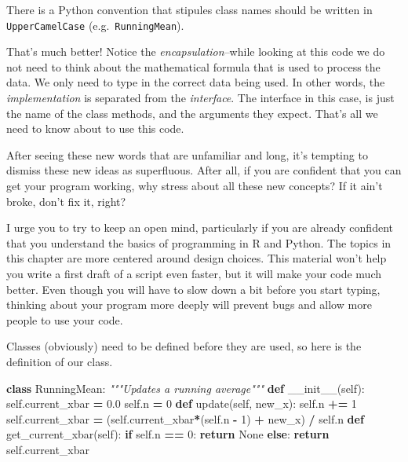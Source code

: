 \documentclass[
  12pt,
  krantz2]{krantz}
\makeatletter
\newenvironment{Shaded}{\begin{snugshade}}{\end{snugshade}}
\newcommand{\CommentTok}[1]{\textcolor[rgb]{0.37,0.37,0.37}{\textit{#1}}}
\newcommand{\ControlFlowTok}[1]{\textcolor[rgb]{0.27,0.27,0.27}{\textbf{#1}}}
\newcommand{\DecValTok}[1]{\textcolor[rgb]{0.06,0.06,0.06}{#1}}
\newcommand{\FloatTok}[1]{\textcolor[rgb]{0.06,0.06,0.06}{#1}}
\newcommand{\FunctionTok}[1]{\textcolor[rgb]{0,0,0}{#1}}
\newcommand{\KeywordTok}[1]{\textcolor[rgb]{0.27,0.27,0.27}{\textbf{#1}}}
\newcommand{\NormalTok}[1]{#1}
\newcommand{\OperatorTok}[1]{\textcolor[rgb]{0.43,0.43,0.43}{\textbf{#1}}}
\newcommand{\VariableTok}[1]{\textcolor[rgb]{0,0,0}{#1}}
\newenvironment{kframe}{%
\medskip{}
\setlength{\fboxsep}{.8em}
 \def\at@end@of@kframe{}%
 \ifinner\ifhmode%
  \def\at@end@of@kframe{\end{minipage}}%
  \begin{minipage}{\columnwidth}%
 \fi\fi%
 \def\FrameCommand##1{\hskip\@totalleftmargin \hskip-\fboxsep
 \colorbox{shadecolor}{##1}\hskip-\fboxsep
     \hskip-\linewidth \hskip-\@totalleftmargin \hskip\columnwidth}%
 \MakeFramed {\advance\hsize-\width
   \@totalleftmargin\z@ \linewidth\hsize
   \@setminipage}}%
 {\par\unskip\endMakeFramed%
 \at@end@of@kframe}
\renewenvironment{Shaded}{\begin{kframe}}{\end{kframe}}
\makeatother
\begin{document}
There is a Python convention that stipules class names should be written in \texttt{UpperCamelCase} (e.g.~\texttt{RunningMean}).

That's much better! Notice the \emph{encapsulation}--while looking at this code we do not need to think about the mathematical formula that is used to process the data. We only need to type in the correct data being used. In other words, the \emph{implementation} is separated from the \emph{interface}. The interface in this case, is just the name of the class methods, and the arguments they expect. That's all we need to know about to use this code.

After seeing these new words that are unfamiliar and long, it's tempting to dismiss these new ideas as superfluous. After all, if you are confident that you can get your program working, why stress about all these new concepts? If it ain't broke, don't fix it, right?

I urge you to try to keep an open mind, particularly if you are already confident that you understand the basics of programming in R and Python. The topics in this chapter are more centered around design choices. This material won't help you write a first draft of a script even faster, but it will make your code much better. Even though you will have to slow down a bit before you start typing, thinking about your program more deeply will prevent bugs and allow more people to use your code.

Classes (obviously) need to be defined before they are used, so here is the definition of our class.

\begin{Shaded}
\begin{Highlighting}[]
\KeywordTok{class}\NormalTok{ RunningMean:}
  \CommentTok{"""Updates a running average"""}
  \KeywordTok{def} \FunctionTok{\_\_init\_\_}\NormalTok{(}\VariableTok{self}\NormalTok{):}
    \VariableTok{self}\NormalTok{.current\_xbar }\OperatorTok{=} \FloatTok{0.0}
    \VariableTok{self}\NormalTok{.n }\OperatorTok{=} \DecValTok{0}
  \KeywordTok{def}\NormalTok{ update(}\VariableTok{self}\NormalTok{, new\_x):}
    \VariableTok{self}\NormalTok{.n }\OperatorTok{+=} \DecValTok{1}
    \VariableTok{self}\NormalTok{.current\_xbar }\OperatorTok{=}\NormalTok{ (}\VariableTok{self}\NormalTok{.current\_xbar}\OperatorTok{*}\NormalTok{(}\VariableTok{self}\NormalTok{.n }\OperatorTok{{-}} \DecValTok{1}\NormalTok{) }\OperatorTok{+}\NormalTok{ new\_x) }\OperatorTok{/} \VariableTok{self}\NormalTok{.n}
  \KeywordTok{def}\NormalTok{ get\_current\_xbar(}\VariableTok{self}\NormalTok{):}
    \ControlFlowTok{if} \VariableTok{self}\NormalTok{.n }\OperatorTok{==} \DecValTok{0}\NormalTok{:}
      \ControlFlowTok{return} \VariableTok{None}
    \ControlFlowTok{else}\NormalTok{:}
      \ControlFlowTok{return} \VariableTok{self}\NormalTok{.current\_xbar}
\end{Highlighting}
\end{Shaded}
\end{document}

